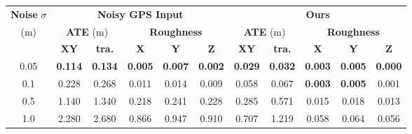 \begin{table}[h!]
    \centering
    {\small
        \begin{tabular}{c|ccccc|ccccc}
            \hline
            \textbf{Noise} $\sigma$ & \multicolumn{5}{c|}{\textbf{Noisy GPS Input}} & \multicolumn{5}{c}{\textbf{Ours}}                                                                                                                                                                                             \\
            (m)                     & \multicolumn{2}{c}{\textbf{ATE} (m)}          & \multicolumn{3}{c|}{\textbf{Roughness}} & \multicolumn{2}{c}{\textbf{ATE} (m)} & \multicolumn{3}{c}{\textbf{Roughness}}                                                                                                       \\
                                    & \textbf{XY}                                   & \textbf{tra.}                           & \textbf{X}                           & \textbf{Y}                             & \textbf{Z}     & \textbf{XY}    & \textbf{tra.}  & \textbf{X}     & \textbf{Y}     & \textbf{Z}     \\
            \hline
            \hline
            0.05                    & \textbf{0.114}                                & \textbf{0.134}                          & \textbf{0.005}                       & \textbf{0.007}                         & \textbf{0.002} & \textbf{0.029} & \textbf{0.032} & \textbf{0.003} & \textbf{0.005} & \textbf{0.000} \\
            0.1                     & 0.228                                         & 0.268                                   & 0.011                                & 0.014                                  & 0.009          & 0.058          & 0.067          & \textbf{0.003} & \textbf{0.005} & 0.001          \\
            0.5                     & 1.140                                         & 1.340                                   & 0.218                                & 0.241                                  & 0.228          & 0.285          & 0.571          & 0.015          & 0.018          & 0.013          \\
            1.0                     & 2.280                                         & 2.680                                   & 0.866                                & 0.947                                  & 0.910          & 0.707          & 1.219          & 0.058          & 0.064          & 0.056          \\

\end{tabular}}
\end{table}
